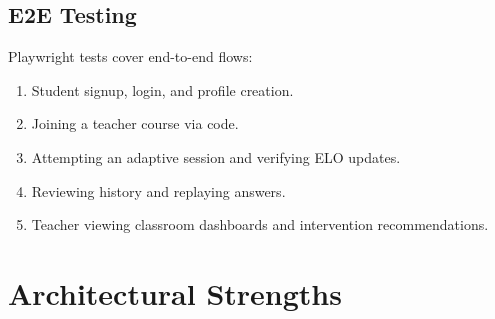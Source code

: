 \documentclass[sigconf,authordraft,twoside]{acmart}
\begin{document}
\subsection{E2E Testing}

Playwright tests cover end-to-end flows:

\begin{enumerate}
\item Student signup, login, and profile creation.
\item Joining a teacher course via code.
\item Attempting an adaptive session and verifying ELO updates.
\item Reviewing history and replaying answers.
\item Teacher viewing classroom dashboards and intervention recommendations.
\end{enumerate}

\section{Architectural Strengths}
\end{document}
